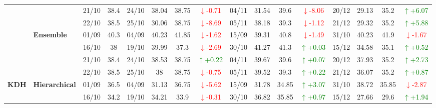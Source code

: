 {\begin{longtable}{llcc|cccc|cccc|cccc}
& 
& 21/10 & 38.4 & 24/10 & 38.04 & 38.75 & \textcolor{red}{\(\downarrow\)-0.71} & 04/11 & 31.54 & 39.6 & \textcolor{red}{\(\downarrow\)-8.06} & 20/12 & 29.13 & 35.2 & \textcolor{green}{\(\uparrow\)+6.07} \\

&
& 22/10 & 38.5 & 25/10 & 30.06 & 38.75 & \textcolor{red}{\(\downarrow\)-8.69} & 05/11 & 38.18 & 39.3 & \textcolor{red}{\(\downarrow\)-1.12} & 21/12 & 29.32 & 35.2 & \textcolor{green}{\(\uparrow\)+5.88} \\
\cmidrule(lr){2-16}


& \textbf{Ensemble}
& 01/09 & 40.3 & 04/09 & 40.23 & 41.85 & \textcolor{red}{\(\downarrow\)-1.62} & 15/09 & 39.31 & 40.8 & \textcolor{red}{\(\downarrow\)-1.49} & 31/10 & 40.23 & 41.9 & \textcolor{red}{\(\downarrow\)-1.67} \\

& 
& 16/10 & 38 & 19/10 & 39.99 & 37.3 & \textcolor{red}{\(\downarrow\)-2.69} & 30/10 & 41.27 & 41.3 & \textcolor{green}{\(\uparrow\)+0.03} & 15/12 & 34.58 & 35.1 & \textcolor{green}{\(\uparrow\)+0.52} \\

& 
& 21/10 & 38.4 & 24/10 & 38.53 & 38.75 & \textcolor{green}{\(\uparrow\)+0.22} & 04/11 & 39.67 & 39.6 & \textcolor{green}{\(\uparrow\)+0.07} & 20/12 & 37.93 & 35.2 & \textcolor{green}{\(\uparrow\)+2.73} \\

&
& 22/10 & 38.5 & 25/10 & 38 & 38.75 & \textcolor{red}{\(\downarrow\)-0.75} & 05/11 & 39.52 & 39.3 & \textcolor{green}{\(\uparrow\)+0.22} & 21/12 & 36.07 & 35.2 & \textcolor{green}{\(\uparrow\)+0.87} \\
\midrule



\multirow{12}{*}{\textbf{KDH}} 
& \textbf{Hierarchical}
& 01/09 & 36.5 & 04/09 & 31.13 & 36.75 & \textcolor{red}{\(\downarrow\)-5.62} & 15/09 & 31.78 & 34.85 & \textcolor{green}{\(\uparrow\)+3.07} & 31/10 & 38.72 & 35.85 & \textcolor{red}{\(\downarrow\)-2.87} \\

&
& 16/10 & 34.2 & 19/10 & 34.21 & 33.9 & \textcolor{red}{\(\downarrow\)-0.31} & 30/10 & 36.82 & 35.85 & \textcolor{green}{\(\uparrow\)+0.97} & 15/12 & 27.66 & 29.6 & \textcolor{green}{\(\uparrow\)+1.94} \\


\end{longtable}}
